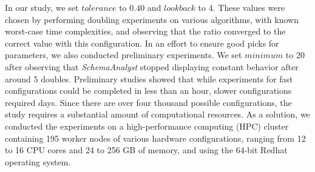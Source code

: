 In our study, we set $\mathit{tolerance}$ to $0.40$ and $\mathit{lookback}$ to $4$. These values were
chosen by performing doubling experiments on various algorithms, with known worst-case time complexities, and observing
that the ratio converged to the correct value with this configuration.  In an effort to ensure good picks for
parameters, we also conducted preliminary experiments. We set $\mathit{minimum}$ to $20$ after observing that
\textit{SchemaAnalyst} stopped displaying constant behavior after around 5 doubles.  Preliminary studies showed that
while experiments for fast configurations could be completed in less than an hour, slower configurations required days.
Since there are over four thousand possible configurations, the study requires a substantial amount of computational
resources.  As a solution, we conducted the experiments on a high-performance computing (HPC) cluster containing 195
worker nodes of various hardware configurations, ranging from 12 to 16 CPU cores and 24 to 256 GB of memory, and using
the 64-bit Redhat operating system.



